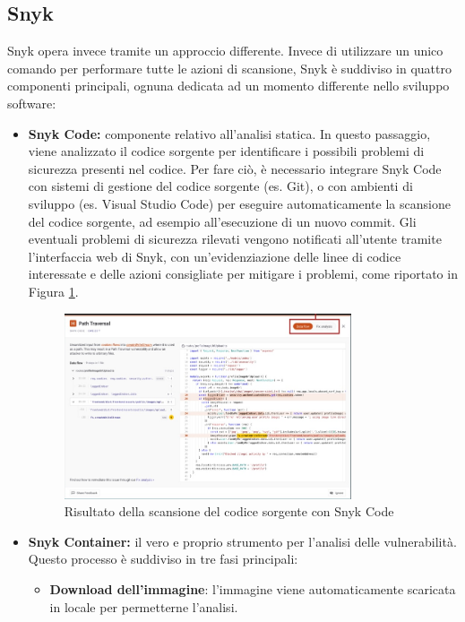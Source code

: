 \subsection{Snyk}
Snyk opera invece tramite un approccio differente\cite{snyk_docs}. Invece di utilizzare un unico comando per performare tutte le azioni di scansione, Snyk è suddiviso in quattro componenti principali, ognuna dedicata ad un momento differente nello sviluppo software:
\begin{itemize}
   \item \textbf{Snyk Code:} componente relativo all'analisi statica. In questo passaggio, viene analizzato il codice sorgente per identificare i possibili problemi di sicurezza presenti nel codice. Per fare ciò, è necessario integrare Snyk Code con sistemi di gestione del codice sorgente (es. Git), o con ambienti di sviluppo (es. Visual Studio Code) per eseguire automaticamente la scansione del codice sorgente, ad esempio all'esecuzione di un nuovo commit. Gli eventuali problemi di sicurezza rilevati vengono notificati all'utente tramite l'interfaccia web di Snyk, con un'evidenziazione delle linee di codice interessate e delle azioni consigliate per mitigare i problemi, come riportato in Figura \ref{fig:snyk_code}.
         \begin{figure}[H]
            \centering
            \includegraphics[width=0.8\textwidth]{immagini/capitolo1/snyk_code.jpg}
            \caption{Risultato della scansione del codice sorgente con Snyk Code}
            \label{fig:snyk_code}
         \end{figure}
   \item \textbf{Snyk Container:} il vero e proprio strumento per l'analisi delle vulnerabilità. Questo processo è suddiviso in tre fasi principali:
         \begin{itemize}
            \item \textbf{Download dell'immagine}: l'immagine viene automaticamente scaricata in locale per permetterne l'analisi.

\end{itemize}
\end{itemize}
